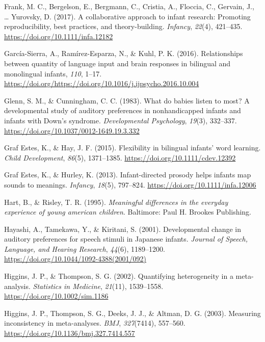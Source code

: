 \documentclass[,man,floatsintext]{apa6}
\begin{document}
\leavevmode\hypertarget{ref-frank_2017}{}%
Frank, M. C., Bergelson, E., Bergmann, C., Cristia, A., Floccia, C., Gervain, J., \ldots{} Yurovsky, D. (2017). A collaborative approach to infant research: Promoting reproducibility, best practices, and theory-building. \emph{Infancy}, \emph{22}(4), 421--435. \url{https://doi.org/10.1111/infa.12182}

\leavevmode\hypertarget{ref-garcia_sierra_2016}{}%
García-Sierra, A., Ramírez-Esparza, N., \& Kuhl, P. K. (2016). Relationships between quantity of language input and brain responses in bilingual and monolingual infants, \emph{110}, 1--17. \url{https://doi.org/https://doi.org/10.1016/j.ijpsycho.2016.10.004}

\leavevmode\hypertarget{ref-glenn_1983}{}%
Glenn, S. M., \& Cunningham, C. C. (1983). What do babies listen to most? A developmental study of auditory preferences in nonhandicapped infants and infants with Down's syndrome. \emph{Developmental Psychology}, \emph{19}(3), 332--337. \url{https://doi.org/10.1037/0012-1649.19.3.332}

\leavevmode\hypertarget{ref-graf_estes_2015}{}%
Graf Estes, K., \& Hay, J. F. (2015). Flexibility in bilingual infants' word learning. \emph{Child Development}, \emph{86}(5), 1371--1385. \url{https://doi.org/10.1111/cdev.12392}

\leavevmode\hypertarget{ref-graf_estes_2013}{}%
Graf Estes, K., \& Hurley, K. (2013). Infant-directed prosody helps infants map sounds to meanings. \emph{Infancy}, \emph{18}(5), 797--824. \url{https://doi.org/10.1111/infa.12006}

\leavevmode\hypertarget{ref-hart_1995}{}%
Hart, B., \& Risley, T. R. (1995). \emph{Meaningful differences in the everyday experience of young american children}. Baltimore: Paul H. Brookes Publishing.

\leavevmode\hypertarget{ref-hayashi_2001}{}%
Hayashi, A., Tamekawa, Y., \& Kiritani, S. (2001). Developmental change in auditory preferences for speech stimuli in Japanese infants. \emph{Journal of Speech, Language, and Hearing Research}, \emph{44}(6), 1189--1200. \url{https://doi.org/10.1044/1092-4388(2001/092)}

\leavevmode\hypertarget{ref-higgins_2002}{}%
Higgins, J. P., \& Thompson, S. G. (2002). Quantifying heterogeneity in a meta-analysis. \emph{Statistics in Medicine}, \emph{21}(11), 1539--1558. \url{https://doi.org/10.1002/sim.1186}

\leavevmode\hypertarget{ref-higgins_2003}{}%
Higgins, J. P., Thompson, S. G., Deeks, J. J., \& Altman, D. G. (2003). Measuring inconsistency in meta-analyses. \emph{BMJ}, \emph{327}(7414), 557--560. \url{https://doi.org/10.1136/bmj.327.7414.557}
\end{document}

